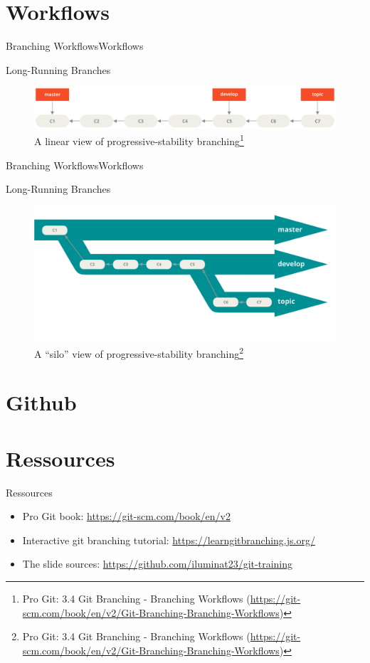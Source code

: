 \documentclass[aspectratio=169]{beamer}
\newcommand{\sectiontitle}{}
\newcommand{\newsection}[1]{\renewcommand{\sectiontitle}{#1}\section{#1}}
\begin{document}
\newsection{Workflows}
\begin{frame}{Branching Workflows}{\sectiontitle}
\begin{block}{Long-Running Branches}
\begin{figure}
    \centering
    \includegraphics[width=\textwidth,height=0.5\textheight,keepaspectratio]{lr-branches-1}
    \caption{
         A linear view of progressive-stability branching\footnote{
            Pro Git: 3.4 Git Branching - Branching Workflows
            (\url{https://git-scm.com/book/en/v2/Git-Branching-Branching-Workflows})
        }
    }
\end{figure}
\end{block}
\end{frame}

\begin{frame}{Branching Workflows}{\sectiontitle}
\begin{block}{Long-Running Branches}
\begin{figure}
    \centering
    \includegraphics[width=\textwidth,height=0.5\textheight,keepaspectratio]{lr-branches-2}
    \caption{
         A “silo” view of progressive-stability branching\footnote{
            Pro Git: 3.4 Git Branching - Branching Workflows
            (\url{https://git-scm.com/book/en/v2/Git-Branching-Branching-Workflows})
        }
    }
\end{figure}
\end{block}
\end{frame}



\newsection{Github}
\newsection{Ressources}
\begin{frame}{Ressources}
\begin{itemize}
    \item Pro Git book: \url{https://git-scm.com/book/en/v2}
    \item Interactive git branching tutorial: \url{https://learngitbranching.js.org/}
    \item The slide sources: \url{https://github.com/iluminat23/git-training}
\end{itemize}
\end{frame}
\end{document}
